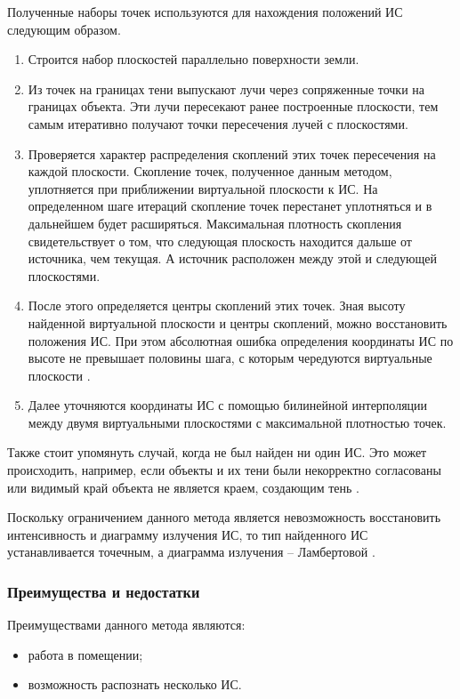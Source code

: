 Полученные наборы точек используются для нахождения положений ИС следующим образом. 

\begin{enumerate}
	\item Строится набор плоскостей параллельно поверхности земли.
	\item Из точек на границах тени выпускают лучи через сопряженные точки на границах объекта. Эти лучи пересекают ранее построенные плоскости, тем самым итеративно получают точки пересечения лучей с плоскостями.
	\item Проверяется характер распределения скоплений этих точек пересечения на каждой плоскости. Скопление точек, полученное данным методом, уплотняется при приближении виртуальной плоскости к ИС. На определенном шаге итераций скопление точек перестанет уплотняться и в дальнейшем будет расширяться. Максимальная плотность скопления свидетельствует о том, что следующая плоскость находится дальше от источника, чем текущая. А источник расположен между этой и следующей плоскостями.
	\item После этого определяется центры скоплений этих точек. Зная высоту найденной виртуальной плоскости и центры скоплений, можно восстановить положения ИС.	При этом абсолютная ошибка определения координаты ИС по высоте не превышает половины шага, с которым чередуются виртуальные плоскости  \cite{shadow_contours_method}.
	\item Далее уточняются координаты ИС с помощью билинейной интерполяции между двумя виртуальными плоскостями с максимальной плотностью точек.
\end{enumerate}

Также стоит упомянуть случай, когда не был найден ни один ИС. Это может происходить, например, если объекты и их тени были некорректно согласованы или видимый край объекта не является краем, создающим тень \cite{shadow_contours_method}.

Поскольку ограничением данного метода является невозможность восстановить интенсивность и диаграмму излучения ИС, то тип найденного ИС устанавливается точечным, а диаграмма излучения -- Ламбертовой \cite{shadow_contours_method}.

\subsubsection*{Преимущества и недостатки}

Преимуществами данного метода являются:

\begin{itemize}
	\item работа в помещении;
	\item возможность распознать несколько ИС. 
\end{itemize}

